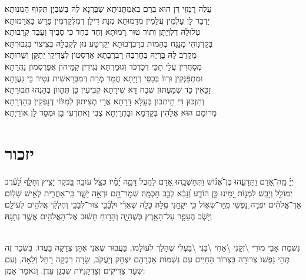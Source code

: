 \documentclass[twoside, openany, parskip=half, 11pt]{book}
\begin{document}
\begin{footnotesize}
\kahal
עֲלֵהּ רָמְזֵי דֵּן הוּא בְּרַם בְּאֶמְתָּנוּתָא שַׂבַּרְנָא לֵהּ בְּשִׁבְיָן תְּקוֹף הֵמְנוּתָא׃\\
\shatz
יַדְבַּר לָן עָלְמִין עֲלֵמִין מְדַמּוּתָא מְנָת דִּילָן דְּמִלְּקַדְמִין פָּרֵשׁ בַּאֲרָמוּתָא׃\\
\kahal
טְלוּלֵהּ דְלִוְיָתָן וְתוֹר טוּר רָמוּתָא וְחַד בְּחַד כִּי סָבִיךְ וְעָבֵד קְרָבוּתָא׃\\
\shatz
בְּקַרְנֽוֹהִי מְנַגַּח בְּהֵמוֹת בְּרַבְרְבוּתָא יְקַרְטַע נוּן לְקִבְלֵהּ בְּצִיצוֹי בִּגְבוּרְתָּא׃\\
\kahal
מְקָרֵב לֵהּ בָּרְיֵהּ בְּחַרְבֵּהּ רַבְרְבָתָא אֲרִסְטוֹן לְצַדִּיקֵי יְתַקֵּן וְשֵׁרוּתָא׃\\
\shatz
מְסַחֲרִין עֲלֵי תַכֵּי דְכַדְכֹּד וְגוּמַרְתָּא נְגִידִין קַמֵּיהוֹן אֲפַרְסְמוֹן נַהֲרָתָא׃\\
\kahal
וּמִתְפַּנְּקִין וּרְווֹ בְּכַסֵּי רְוָיָתָא חֲמַר מְרַת דְּמִבְּרֵאשִׁית נְטִיר בֵּי נַעֲוָתָא׃\\
\shatz
זַכָּאִין כַּד שְׁמַעְתּוּן שְׁבַח דָּא שִׁירָתָא קְבִיעִין כֵּן תֶּהֱווֹן בְּהַנְהוּ חֲבוּרָתָא׃\\
\kahal
וְתִזְכּוּן דִּי תֵיתְבוּן בְּעֵֽלָּא דָרָתָא אֲרֵי תְצִיתוּן לְמִלּוֹי דְנָפְקִין בְּהַדְרָתָא׃\\
\shatz
מְרוֹמָם הוּא אֱלָהִין בְּקַדְמָא וּבָתְרַיְתָא צְבִי וְאִתְרְעִי בָן וּמְסַר לָן אוֹרַיְתָא׃\\ 
\end{footnotesize}

\section[יזכור]{ יזכור }


יְיָ֗ מָֽה־אָ֭דָם וַתֵּדָעֵ֑הוּ בֶּן־אֱ֝נ֗וֹשׁ וַתְּחַשְּׁבֵֽהוּ׃ אָ֭דָם לַהֶ֣בֶל דָּמָ֑ה יָ֝מָ֗יו כְּצֵ֣ל עוֹבֵֽר׃
בַּ֭בֹּקֶר יָצִ֣יץ וְחָלָ֑ף לָ֝עֶ֗רֶב יְמוֹלֵ֥ל וְיָבֵֽשׁ׃ לִמְנ֣וֹת יָ֭מֵינוּ כֵּ֣ן הוֹדַ֑ע וְ֝נָבִ֗א לְבַ֣ב חׇכְמָֽה׃
שְׁמׇר־תָּ֭ם וּרְאֵ֣ה יָשָׁ֑ר כִּֽי־אַחֲרִ֖ית לְאִ֣ישׁ שָׁלֽוֹם׃
אַךְ־אֱלֹהִ֗ים יִפְדֶּ֣ה נַ֭פְשִׁי מִֽיַּד־שְׁא֑וֹל כִּ֖י יִקָּחֵ֣נִי סֶֽלָה׃ 
כָּלָ֥ה שְׁאֵרִ֗י וּלְבָ֫בִ֥י צוּר־לְבָבִ֥י וְחֶלְקִ֗י אֱלֹהִ֥ים לְעוֹלָֽם׃ 
וְיָשֹׁ֧ב הֶעָפָ֛ר עַל־הָאָ֖רֶץ כְּשֶׁהָיָ֑ה וְהָר֣וּחַ תָּשׁ֔וּב אֶל־הָאֱלֹהִ֖ים אֲשֶׁ֥ר נְתָנָֽהּ׃

\\
נִשְׁמַת אָבִי מוֹרִי \textbackslash זְקֵנִי \textbackslash אָחִי \textbackslash בְּנִי \textbackslash בַּעְלִי  שְׁהָלַךְ לְעוֹלָמוֹ, בַּעֲבוּר שֶׁאֲנִי אֶתֵּן צְדָקָה בַּעֲדוֹ. בִּשְׂכַר זֶה תְּהֵי נַפְשׁוֹ צְרוּרָה בִּצְרוֹר הַחַיִּים עִם נִשְׁמוֹת אַבְרָהַם יִצְחָק וְיַעֲקֹב, שָׂרָה רִבְקָה רָחֵל וְלֵאָה, וְעִם שְׁעָר צַדִּיקִים וְצַדְקָנִיּוֹת שְבְּגַן עֵדֶן. וְנֹאמַר אָמֶן:
\end{document}
